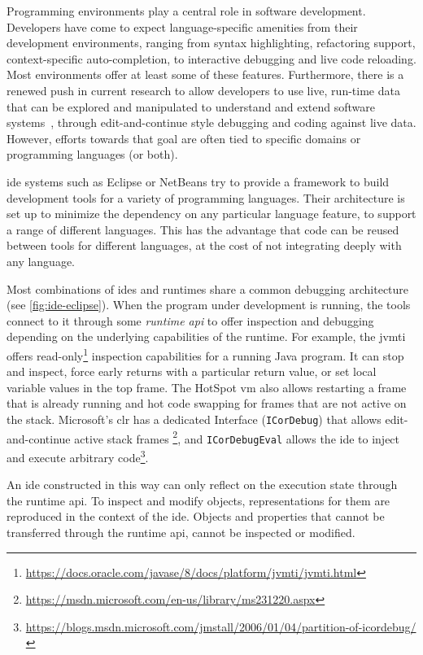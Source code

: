 \documentclass[sigconf,english]{acmart}
\newcommand{\ac}[1]{\gls*{#1}}
\newcommand{\acp}[1]{\glspl*{#1}}
\begin{document}
Programming environments play a central role in software development. Developers
have come to expect language-specific amenities from their development
environments, ranging from syntax highlighting, refactoring support,
context-specific auto-completion, to interactive debugging and live code
reloading. Most environments offer at least some of these features. Furthermore,
there is a renewed push in current research to allow developers to use live,
run-time data that can be explored and manipulated to understand and extend
software systems~\cite{bracha:2012:debug-mode,victor2012stop}, through
edit-and-continue style debugging and coding against live data. However, efforts
towards that goal are often tied to specific domains or programming languages
(or both).

\ac{ide} systems such as Eclipse or NetBeans try to provide a framework to
build development tools for a variety of programming languages. Their
architecture is set up to minimize the dependency on any particular language
feature, to support a range of different languages. This has the advantage that
code can be reused between tools for different languages, at the cost of not
integrating deeply with any language.

Most combinations of \acp{ide} and runtimes share a common debugging
architecture (see \autoref{fig:ide-eclipse}). When the program under
development is running, the tools connect to it through some \emph{runtime
  \ac{api}} to offer inspection and debugging depending on the underlying
capabilities of the runtime. For example, the \ac{jvmti} offers
read-only\footnote{\url{https://docs.oracle.com/javase/8/docs/platform/jvmti/jvmti.html}}
inspection capabilities for a running Java program. It can stop and inspect,
force early returns with a particular return value, or set local variable
values in the top frame. The HotSpot \ac{vm} also allows restarting a frame
that is already running and hot code swapping for frames that are not active on
the stack. Microsoft's \ac{clr} has a dedicated Interface
(\lstinline{ICorDebug}) that allows edit-and-continue active stack frames%
\footnote{\url{https://msdn.microsoft.com/en-us/library/ms231220.aspx}}, and
\lstinline{ICorDebugEval} allows the \ac{ide} to inject and execute arbitrary
code\footnote{\url{https://blogs.msdn.microsoft.com/jmstall/2006/01/04/partition-of-icordebug/}}.

An \ac{ide} constructed in this way can only reflect on the execution state
through the runtime \ac{api}. To inspect and modify objects, representations for
them are reproduced in the context of the \ac{ide}. Objects and properties that
cannot be transferred through the runtime \ac{api}, cannot be inspected or
modified.
\end{document}

